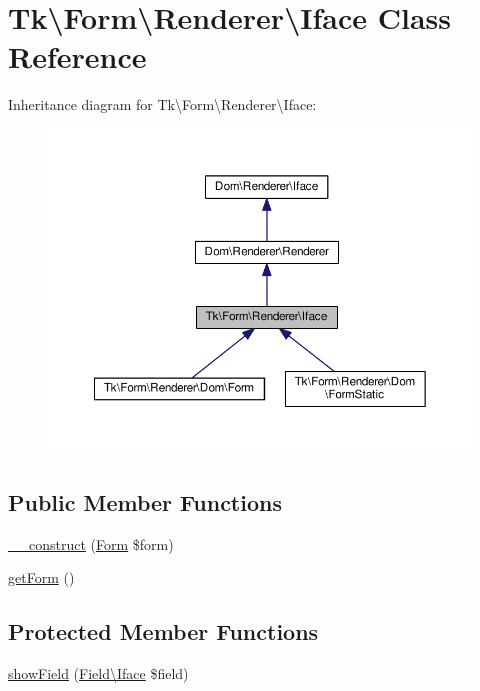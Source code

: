 \hypertarget{classTk_1_1Form_1_1Renderer_1_1Iface}{\section{Tk\textbackslash{}Form\textbackslash{}Renderer\textbackslash{}Iface Class Reference}
\label{classTk_1_1Form_1_1Renderer_1_1Iface}
}


Inheritance diagram for Tk\textbackslash{}Form\textbackslash{}Renderer\textbackslash{}Iface\+:\nopagebreak
\begin{figure}[H]
\begin{center}
\leavevmode
\includegraphics[width=350pt]{classTk_1_1Form_1_1Renderer_1_1Iface__inherit__graph}
\end{center}
\end{figure}
\subsection*{Public Member Functions}
\begin{DoxyCompactItemize}
\item 
\hyperlink{classTk_1_1Form_1_1Renderer_1_1Iface_a82034cf48ff5311db2ff93a1778e8ad6}{\+\_\+\+\_\+construct} (\hyperlink{classTk_1_1Form}{Form} \$form)
\item 
\hyperlink{classTk_1_1Form_1_1Renderer_1_1Iface_a3369a1b16d80d638a4dfd77ffe44a46f}{get\+Form} ()
\end{DoxyCompactItemize}
\subsection*{Protected Member Functions}
\begin{DoxyCompactItemize}
\item 
\hyperlink{classTk_1_1Form_1_1Renderer_1_1Iface_ad407035177586de22e69768a340002ed}{show\+Field} (\hyperlink{classTk_1_1Form_1_1Field_1_1Iface}{Field\textbackslash{}\+Iface} \$field)
\end{DoxyCompactItemize}
